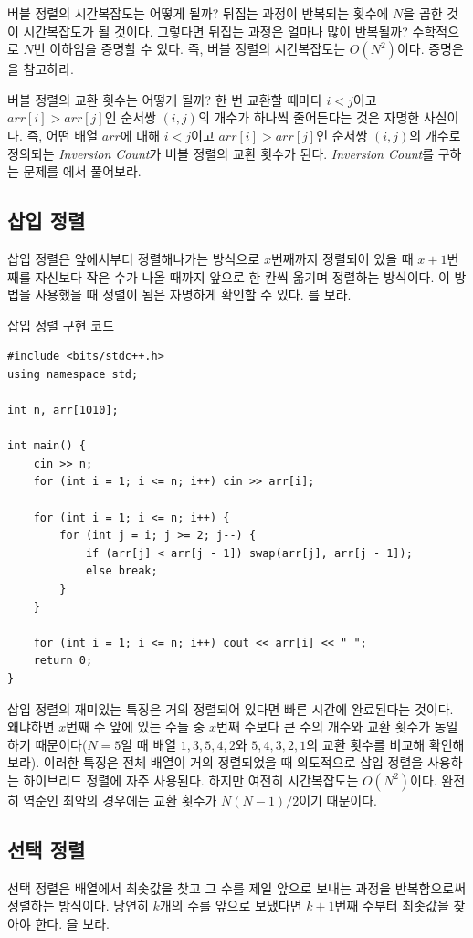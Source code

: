 버블 정렬의 시간복잡도는 어떻게 될까? 뒤집는 과정이 반복되는 횟수에 $N$을 곱한 것이 시간복잡도가 될 것이다. 그렇다면 뒤집는 과정은 얼마나 많이 반복될까? 수학적으로 $N$번 이하임을 증명할 수 있다. 즉, 버블 정렬의 시간복잡도는 $O(N^2)$이다. 증명은 을 참고하라.

버블 정렬의 교환 횟수는 어떻게 될까? 한 번 교환할 때마다 $i<j$이고 $arr[i]>arr[j]$인 순서쌍 $(i, j)$의 개수가 하나씩 줄어든다는 것은 자명한 사실이다. 즉, 어떤 배열 $arr$에 대해 $i<j$이고 $arr[i]>arr[j]$인 순서쌍 $(i, j)$의 개수로 정의되는 \textit{Inversion Count}가 버블 정렬의 교환 횟수가 된다. \textit{Inversion Count}를 구하는 문제를 에서 풀어보라.

\subsection{삽입 정렬}
삽입 정렬은 앞에서부터 정렬해나가는 방식으로 $x$번째까지 정렬되어 있을 때 $x+1$번째를 자신보다 작은 수가 나올 때까지 앞으로 한 칸씩 옮기며 정렬하는 방식이다. 이 방법을 사용했을 때 정렬이 됨은 자명하게 확인할 수 있다. 를 보라.

\begin{code} \label{code: insertion}
삽입 정렬 구현 코드
\begin{lstlisting}
#include <bits/stdc++.h>
using namespace std;

int n, arr[1010];

int main() {
    cin >> n;
    for (int i = 1; i <= n; i++) cin >> arr[i];

    for (int i = 1; i <= n; i++) {
        for (int j = i; j >= 2; j--) {
            if (arr[j] < arr[j - 1]) swap(arr[j], arr[j - 1]);
            else break;
        }
    }

    for (int i = 1; i <= n; i++) cout << arr[i] << " ";
    return 0;
}
\end{lstlisting}
\end{code}

삽입 정렬의 재미있는 특징은 거의 정렬되어 있다면 빠른 시간에 완료된다는 것이다. 왜냐하면 $x$번째 수 앞에 있는 수들 중 $x$번째 수보다 큰 수의 개수와 교환 횟수가 동일하기 때문이다($N=5$일 때 배열 $1, 3, 5, 4, 2$와 $5, 4, 3, 2, 1$의 교환 횟수를 비교해 확인해보라). 이러한 특징은 전체 배열이 거의 정렬되었을 때 의도적으로 삽입 정렬을 사용하는 하이브리드 정렬에 자주 사용된다. 하지만 여전히 시간복잡도는 $O(N^2)$이다. 완전히 역순인 최악의 경우에는 교환 횟수가 $N(N-1)/2$이기 때문이다.

\subsection{선택 정렬}
선택 정렬은 배열에서 최솟값을 찾고 그 수를 제일 앞으로 보내는 과정을 반복함으로써 정렬하는 방식이다. 당연히 $k$개의 수를 앞으로 보냈다면 $k+1$번째 수부터 최솟값을 찾아야 한다. 을 보라.


